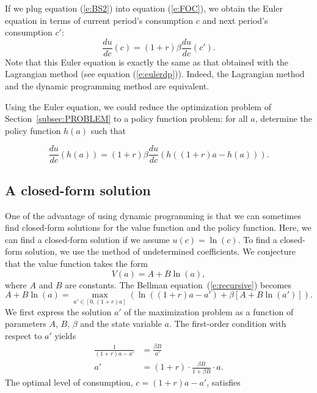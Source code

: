 \documentclass{article}
\begin{document}
If we plug equation (\ref{e:BS2}) into equation (\ref{e:FOC}), we obtain the Euler equation in terms of current period's consumption $c$ and next period's consumption $c'$:
\wcSpan*[id=equation-13]{}
\setcounter{tpequation}{12}\label{Euler}
\[
\frac{d u}{d c}(c)=(1+r) \beta \frac{d u}{d c}(c').\tag{13}
\]
Note that this Euler equation is exactly the same as that obtained with the Lagrangian method (see equation (\ref{e:eulerdp})). Indeed, the Lagrangian method and the dynamic programming method are equivalent.

Using the Euler equation, we could reduce the optimization problem of Section~\ref{subsec:PROBLEM} to a policy function problem: for all $a$, determine the policy function $h(a)$ such that

\[
\frac{d u}{d c}(h(a))=(1+r) \beta \frac{d u}{d c}(h((1+r) a-h(a))).
\]

\subsection{A closed-form solution}\label{guess}\wcSpan*[id=ref-guess]{}

One of the advantage of using dynamic programming is that we can sometimes find closed-form solutions for the value function and the policy function. Here, we can find a closed-form solution if we assume $u(c)=\ln\left(c\right)$. To find a closed-form solution, we use the method of undetermined coefficients. We conjecture that the value function takes the form
\wcSpan*[id=equation-14]{}
\setcounter{tpequation}{13}\label{e:fun}
\[
V(a)=A+B \ln\left(a\right),\tag{14}
\]
where $A$ and $B$ are constants. The Bellman equation~(\ref{e:recursive}) becomes
\wcSpan*[id=equation-15]{}
\setcounter{tpequation}{14}\label{e:AB}
\[
A+B \ln\left(a\right)=\max_{a'\in[0,(1+r) a]}\left(\ln\left((1+r) a-a'\right)+\beta \left[A+B \ln\left(a'\right)\right]\right).\tag{15}
\]
We first express the solution $a'$ of the maximization problem as a function of parameters $A$, $B$, $\beta$ and the state variable $a$. The first-order condition with respect to $a'$ yields
\wcSpan*[id=equation-16]{}
\setcounter{tpequation}{15}\label{e:focAB}
\[
\begin{align*}
\frac{1}{(1+r) a-a'}&=\frac{\beta B}{a'}\\
a'&=(1+r) \cdot \frac{\beta B}{1+\beta B} \cdot a .\tag{16}
\end{align*}
\]
The optimal level of consumption, $c=(1+r) a-a'$, satisfies
\end{document}

